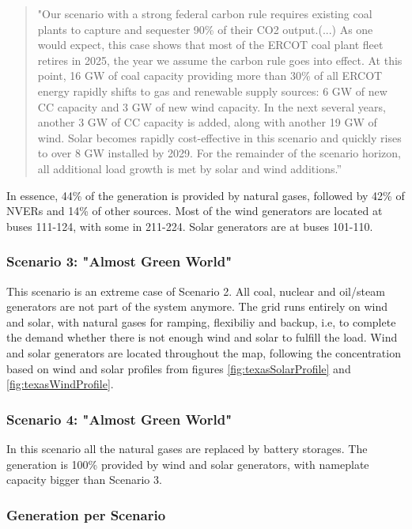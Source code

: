 \documentclass[12pt,LUDisStyle,twosided]{book}
\begin{document}
\begin{quotation}
"Our scenario with a strong federal carbon rule requires existing coal plants to capture and sequester 90\% of their CO2 output.(...)
As one would expect, this case shows that most of the ERCOT coal plant fleet retires in 2025, the year we assume the carbon rule goes into effect. At this point, 16 GW of coal capacity providing more than 30\% of all ERCOT energy rapidly shifts to gas and renewable supply sources: 6 GW of new CC capacity and 3 GW of new wind capacity. In the next several years, another 3 GW of CC capacity is added, along with another 19 GW of wind. Solar becomes rapidly cost-effective in this scenario and quickly rises to over 8 GW installed by 2029. For the remainder of the scenario horizon, all additional load growth is met by solar and wind additions.”
\end{quotation}

In essence, 44\% of the generation is provided by natural gases, followed by 42\% of NVERs and 14\% of other sources. Most of the wind generators are located at buses 111-124, with some in 211-224. Solar generators are at buses 101-110.


\subsubsection{Scenario 3: "Almost Green World"}

This scenario is an extreme case of Scenario 2. All coal, nuclear and oil/steam generators are not part of the system anymore. The grid runs entirely on wind and solar, with natural gases for ramping, flexibiliy and backup, i.e, to complete the demand whether there is not enough wind and solar to fulfill the load. Wind and solar generators are located throughout the map, following the concentration based on wind and solar profiles from figures \ref{fig:texasSolarProfile} and \ref{fig:texasWindProfile}.

\subsubsection{Scenario 4: "Almost Green World"}

In this scenario all the natural gases are replaced by battery storages. The generation is 100\% provided by wind and solar generators, with nameplate capacity bigger than Scenario 3.

\subsubsection{Generation per Scenario}
\end{document}

